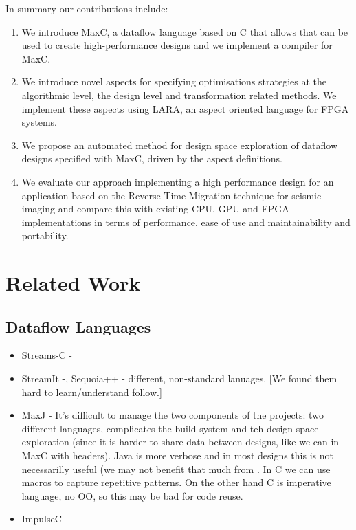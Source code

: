 In summary our contributions include:
\begin{enumerate}
\item We introduce MaxC, a dataflow language based on C that allows
  that can be used to create high-performance designs and we implement
  a compiler for MaxC.
\item We introduce novel aspects for specifying optimisations
  strategies at the algorithmic level, the design level and
  transformation related methods. We implement these aspects using
  LARA, an aspect oriented language for FPGA systems.
\item We propose an automated method for design space exploration of
  dataflow designs specified with MaxC, driven by the aspect
  definitions.
\item We evaluate our approach implementing a high performance design
  for an application based on the Reverse Time Migration technique for
  seismic imaging and compare this with existing CPU, GPU and FPGA
  implementations in terms of performance, ease of use and
  maintainability and portability.
\end{enumerate}





\section{Related Work}

\subsection{Dataflow Languages}
\begin{itemize}

\item Streams-C -

\item StreamIt -, Sequoia++ - different, non-standard lanuages. [We
  found them hard to learn/understand follow.]

\item MaxJ - It’s difficult to manage the two components of the
  projects: two different languages, complicates the build system and
  teh design space exploration (since it is harder to share data
  between designs, like we can in MaxC with headers). Java is more
  verbose and in most designs this is not necessarilly useful (we may
  not benefit that much from . In C we can use macros to capture
  repetitive patterns. On the other hand C is imperative language, no
  OO, so this may be bad for code reuse.

\item ImpulseC

\end{itemize}

